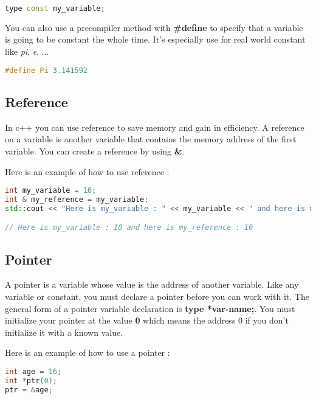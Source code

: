 \documentclass[a4paper, 12pt, titlepage]{scrartcl} %
\begin{document}
\begin{lstlisting}[language=C++]
type const my_variable;
\end{lstlisting} \vspace{5mm}

You can also use a precompiler method with \textbf{\#define} to specify that a variable is going to be constant the whole time. It's especially use for real world constant like \textit{pi}, \textit{e}, ...

\begin{lstlisting}[language=C++]
#define Pi 3.141592
\end{lstlisting} \vspace{5mm}


\subsection{Reference}
In c++ you can use reference to save memory and gain in efficiency. A reference on a variable is another variable that contains the memory address of the first variable. You can create a reference by using \textbf{\&}.

\vspace{5mm}

Here is an example of how to use reference :
\begin{lstlisting}[language=C++]
int my_variable = 10;
int & my_reference = my_variable;
std::cout << "Here is my_variable : " << my_variable << " and here is my_reference : " << my_reference << std::endl;

// Here is my_variable : 10 and here is my_reference : 10
\end{lstlisting} \vspace{5mm}

\subsection{Pointer}
A pointer is a variable whose value is the address of another variable. Like any variable or constant, you must declare a pointer before you can work with it. The general form of a pointer variable declaration is \textbf{type *var-name;}. You must initialize your pointer at the value \textbf{0} which means the address 0 if you don't initialize it with a known value.

\vspace{5mm}

Here is an example of how to use a pointer :
\begin{lstlisting}[language=C++]
int age = 16;
int *ptr(0);
ptr = &age;
\end{lstlisting} \vspace{5mm}
\end{document}
